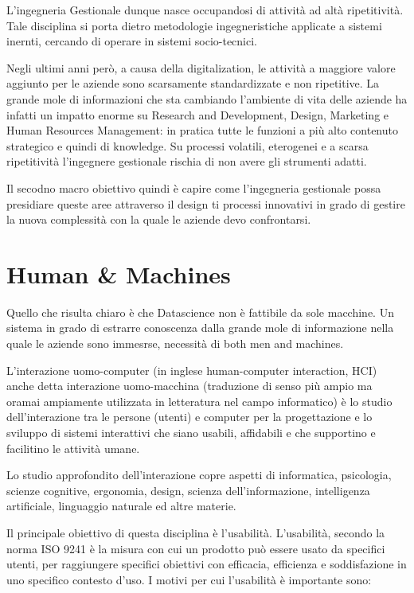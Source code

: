 \documentclass[]{book}
\begin{document}
L'ingegneria Gestionale dunque nasce occupandosi di attività ad altà
ripetitività. Tale disciplina si porta dietro metodologie
ingegneristiche applicate a sistemi inernti, cercando di operare in
sistemi socio-tecnici.

Negli ultimi anni però, a causa della digitalization, le attività a
maggiore valore aggiunto per le aziende sono scarsamente standardizzate
e non ripetitive. La grande mole di informazioni che sta cambiando
l'ambiente di vita delle aziende ha infatti un impatto enorme su
Research and Development, Design, Marketing e Human Resources
Management: in pratica tutte le funzioni a più alto contenuto strategico
e quindi di knowledge. Su processi volatili, eterogenei e a scarsa
ripetitività l'ingegnere gestionale rischia di non avere gli strumenti
adatti.

Il secodno macro obiettivo quindi è capire come l'ingegneria gestionale
possa presidiare queste aree attraverso il design ti processi innovativi
in grado di gestire la nuova complessità con la quale le aziende devo
confrontarsi.

\section{Human \& Machines}\label{human-machines}

Quello che risulta chiaro è che Datascience non è fattibile da sole
macchine. Un sistema in grado di estrarre conoscenza dalla grande mole
di informazione nella quale le aziende sono immesrse, necessità di both
men and machines.

L'interazione uomo-computer (in inglese human-computer interaction, HCI)
anche detta interazione uomo-macchina (traduzione di senso più ampio ma
oramai ampiamente utilizzata in letteratura nel campo informatico) è lo
studio dell'interazione tra le persone (utenti) e computer per la
progettazione e lo sviluppo di sistemi interattivi che siano usabili,
affidabili e che supportino e facilitino le attività umane.

Lo studio approfondito dell'interazione copre aspetti di informatica,
psicologia, scienze cognitive, ergonomia, design, scienza
dell'informazione, intelligenza artificiale, linguaggio naturale ed
altre materie.

Il principale obiettivo di questa disciplina è l'usabilità. L'usabilità,
secondo la norma ISO 9241 \citep{jokela2003standard} è la misura con cui
un prodotto può essere usato da specifici utenti, per raggiungere
specifici obiettivi con efficacia, efficienza e soddisfazione in uno
specifico contesto d'uso. I motivi per cui l'usabilità è importante
sono:
\end{document}
